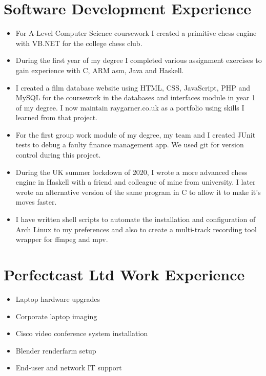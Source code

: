 \documentclass{article}
\begin{document}
\section{Software Development Experience}

\begin{itemize}[noitemsep]

\renewcommand{\labelitemi}{$\square$}
\item For A-Level Computer Science coursework I created a primitive chess engine with VB.NET for the college chess club.
\item During the first year of my degree I completed various assignment exercises to gain experience with C, ARM asm, Java and Haskell.
\item I created a film database website using HTML, CSS, JavaScript, PHP and MySQL for the coursework in the databases and interfaces module in year 1 of my degree. I now maintain raygarner.co.uk as a portfolio using skills I learned from that project.
\item For the first group work module of my degree, my team and I created JUnit tests to debug a faulty finance management app. We used git for version control during this project.
\item During the UK summer lockdown of 2020, I wrote a more advanced chess engine in Haskell with a friend and colleague of mine from university. I later wrote an alternative version of the same program in C to allow it to make it's moves faster.
\item I have written shell scripts to automate the installation and configuration of Arch Linux to my preferences and also to create a multi-track recording tool wrapper for ffmpeg and mpv.

\end{itemize}




\section{Perfectcast Ltd Work Experience}


\begin{itemize}[noitemsep]

\renewcommand{\labelitemi}{$\square$}
\item Laptop hardware upgrades
\item Corporate laptop imaging
\item Cisco video conference system installation
\item Blender renderfarm setup
\item End-user and network IT support

\end{itemize}
\end{document}
